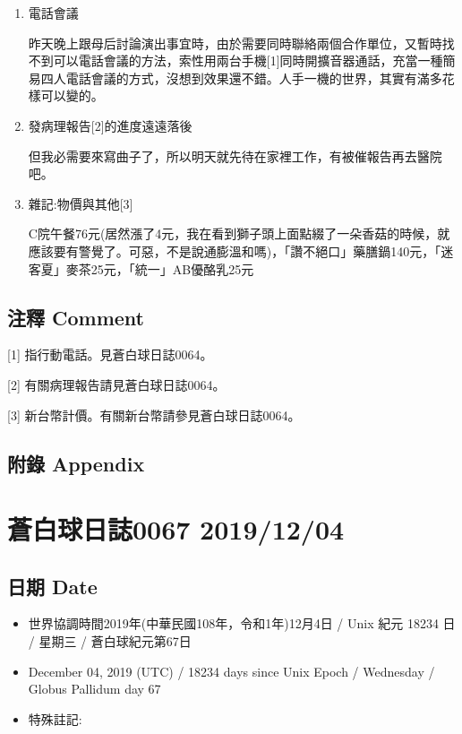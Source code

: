 \documentclass[
]{article}
\providecommand{\tightlist}{%
  \setlength{\itemsep}{0pt}\setlength{\parskip}{0pt}}
\begin{document}
\begin{enumerate}
\def\labelenumi{\arabic{enumi}.}
\item
  電話會議

  昨天晚上跟母后討論演出事宜時，由於需要同時聯絡兩個合作單位，又暫時找不到可以電話會議的方法，索性用兩台手機{[}1{]}同時開擴音器通話，充當一種簡易四人電話會議的方式，沒想到效果還不錯。人手一機的世界，其實有滿多花樣可以變的。
\item
  發病理報告{[}2{]}的進度遠遠落後

  但我必需要來寫曲子了，所以明天就先待在家裡工作，有被催報告再去醫院吧。
\item
  雜記:物價與其他{[}3{]}

  C院午餐76元(居然漲了4元，我在看到獅子頭上面點綴了一朵香菇的時候，就應該要有警覺了。可惡，不是說通膨溫和嗎)，「讚不絕口」藥膳鍋140元，「迷客夏」麥茶25元，「統一」AB優酪乳25元
\end{enumerate}

\hypertarget{ux6ce8ux91cb-comment-2}{%
\subsection{注釋 Comment}\label{ux6ce8ux91cb-comment-2}}

{[}1{]} 指行動電話。見蒼白球日誌0064。

{[}2{]} 有關病理報告請見蒼白球日誌0064。

{[}3{]} 新台幣計價。有關新台幣請參見蒼白球日誌0064。

\hypertarget{ux9644ux9304-appendix-2}{%
\subsection{附錄 Appendix}\label{ux9644ux9304-appendix-2}}

\hypertarget{ux84bcux767dux7403ux65e5ux8a8c0067-20191204}{%
\section{蒼白球日誌0067
2019/12/04}\label{ux84bcux767dux7403ux65e5ux8a8c0067-20191204}}

\hypertarget{ux65e5ux671f-date-3}{%
\subsection{日期 Date}\label{ux65e5ux671f-date-3}}

\begin{itemize}
\tightlist
\item
  世界協調時間2019年(中華民國108年，令和1年)12月4日 / Unix 紀元 18234 日
  / 星期三 / 蒼白球紀元第67日
\item
  December 04, 2019 (UTC) / 18234 days since Unix Epoch / Wednesday /
  Globus Pallidum day 67
\item
  特殊註記:
\end{itemize}
\end{document}
